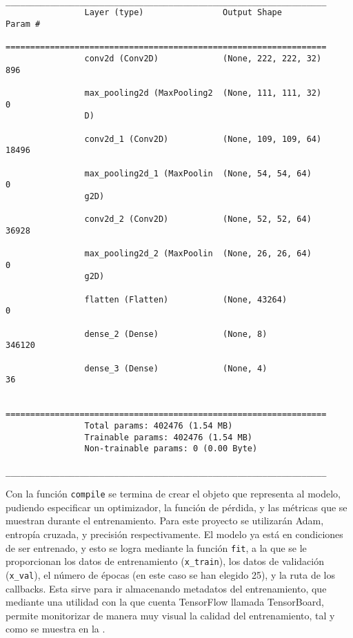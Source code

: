			\begin{verbatim}
				_________________________________________________________________
				Layer (type)                Output Shape              Param #   
				=================================================================
				conv2d (Conv2D)             (None, 222, 222, 32)      896       
				
				max_pooling2d (MaxPooling2  (None, 111, 111, 32)      0         
				D)                                                              
				
				conv2d_1 (Conv2D)           (None, 109, 109, 64)      18496     
				
				max_pooling2d_1 (MaxPoolin  (None, 54, 54, 64)        0         
				g2D)                                                            
				
				conv2d_2 (Conv2D)           (None, 52, 52, 64)        36928     
				
				max_pooling2d_2 (MaxPoolin  (None, 26, 26, 64)        0         
				g2D)                                                            
				
				flatten (Flatten)           (None, 43264)             0         
				
				dense_2 (Dense)             (None, 8)                 346120    
				
				dense_3 (Dense)             (None, 4)                 36        
				
				=================================================================
				Total params: 402476 (1.54 MB)
				Trainable params: 402476 (1.54 MB)
				Non-trainable params: 0 (0.00 Byte)
				_________________________________________________________________
			\end{verbatim}
			
			Con la función \texttt{compile} se termina de crear el objeto que representa al modelo, pudiendo especificar un optimizador, la función de pérdida, y las métricas que se muestran durante el entrenamiento. Para este proyecto se utilizarán Adam, entropía cruzada, y precisión respectivamente. El modelo ya está en condiciones de ser entrenado, y esto se logra mediante la función \texttt{fit}, a la que se le proporcionan los datos de entrenamiento (\texttt{x\_train}), los datos de validación (\texttt{x\_val}), el número de épocas (en este caso se han elegido 25), y la ruta de los callbacks. Esta sirve para ir almacenando metadatos del entrenamiento, que mediante una utilidad con la que cuenta TensorFlow llamada TensorBoard, permite monitorizar de manera muy visual la calidad del entrenamiento, tal y como se muestra en la . \\
			
